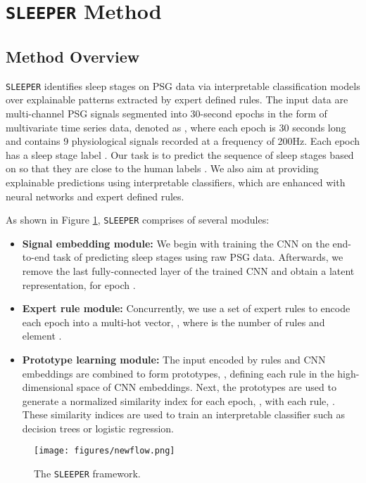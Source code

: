 \documentclass[pmlr]{jmlr}
\newcommand{\mname}
{\texttt{SLEEPER}\xspace}
\begin{document}
\section{\mname Method}

\subsection{Method Overview}



\mname identifies sleep stages on PSG data via interpretable classification models over explainable patterns extracted by expert defined rules. The input data are multi-channel PSG signals segmented into 30-second epochs in the form of multivariate time series data, denoted as 
, where each epoch  is 30 seconds long and contains 9 physiological signals recorded at a frequency of 200Hz. Each epoch  has a sleep stage label . Our task is to predict the sequence of sleep stages  based on  so that they are close to the human labels . We also aim at providing explainable predictions using interpretable classifiers, which are enhanced with neural networks and expert defined rules.

As shown in Figure \ref{fig:flow}, \mname comprises of several modules:\begin{itemize}
    \item {\bf Signal embedding module:} We begin with training the CNN on the end-to-end task of predicting sleep stages using raw PSG data. Afterwards, we remove the last fully-connected layer of the trained CNN and obtain a latent representation,  for epoch .
    \item {\bf Expert rule module:} Concurrently, we use a set of expert rules to encode each epoch into a multi-hot vector, , where  is the number of rules and element . 
    \item {\bf Prototype learning module:} The input encoded by rules and CNN embeddings are combined to form prototypes, , defining each rule in the high-dimensional space of CNN embeddings. Next, the prototypes are used to generate a normalized similarity index for each epoch, , with each rule, . These similarity indices are used to train an interpretable classifier such as decision trees or logistic regression. 
\end{itemize}




\begin{figure}[htbp]
  \centering 
  \texttt{[image: figures/newflow.png]} 
  \caption{The \mname framework.}
  \label{fig:flow} 
\end{figure} 
\end{document}
